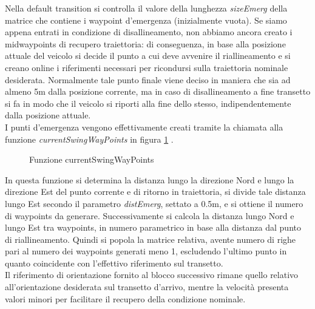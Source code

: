 \documentclass{article}
\begin{document}
            Nella default transition si controlla il valore della lunghezza \emph{sizeEmerg} della matrice che contiene i waypoint d'emergenza (inizialmente vuota). 
            Se siamo appena entrati in condizione di disallineamento, non abbiamo ancora creato i midwaypoints di recupero traiettoria: di conseguenza, in base alla posizione
            attuale del veicolo si decide il punto a cui deve avvenire il riallineamento e si creano online i riferimenti necessari per ricondursi sulla traiettoria nominale desiderata.
            Normalmente tale punto finale viene deciso in maniera che sia ad almeno 5m dalla posizione corrente, ma in caso di disallineamento a fine transetto si fa in modo
            che il veicolo si riporti alla fine dello stesso, indipendentemente dalla posizione attuale.\\
            I punti d'emergenza vengono effettivamente creati tramite la chiamata alla funzione \emph{currentSwingWayPoints} in figura \ref{fig:emerg} .

            \begin{figure} [ht]
                \caption{Funzione currentSwingWayPoints}
                \label{fig:emerg}
            \end{figure}

            In questa funzione si determina la distanza lungo la direzione Nord e lungo la direzione Est del punto corrente e di ritorno in traiettoria, si 
            divide tale distanza lungo Est secondo il parametro \emph{distEmerg}, settato a 0.5m, e si ottiene il numero di waypoints da generare.
            Successivamente si calcola la distanza lungo Nord e 
            lungo Est tra waypoints, in numero parametrico in base alla distanza dal punto di riallineamento. Quindi si popola la matrice relativa, avente numero di righe
            pari al numero dei waypoints generati meno 1, escludendo l'ultimo punto in quanto coincidente con l'effettivo riferimento sul transetto. 
            \\
            Il riferimento di orientazione fornito al blocco successivo rimane quello relativo all'orientazione desiderata sul transetto d'arrivo, mentre la velocità
            presenta valori minori per facilitare il recupero della condizione nominale.
\end{document}
